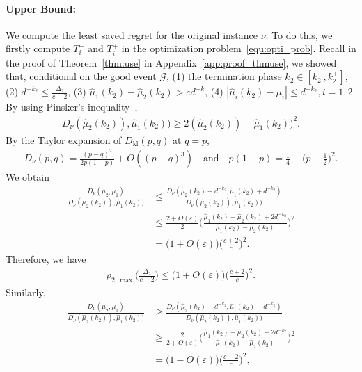\documentclass[twoside,11pt]{article}
\newcommand{\kl}{D_{\mathrm{kl}}}
\newcommand{\calG}{\mathcal{G}}
\newcommand{\hatmu}{\hat{\mu}}
\newcommand{\klnu}{D_{\nu}}
\begin{document}
\paragraph{Upper Bound:}  
We compute the least saved regret for the original instance $\nu$.
To do this, we firstly compute $T_i^-$ and $T_i^+$ in the optimization problem~\eqref{equ:opti_prob}.
Recall in the proof of Theorem~\ref{thm:use} in Appendix~\ref{app:proof_thmuse}, we showed that, conditional on the good event $\calG$, (1) the termination phase $k_2\in[k_2^-,k_2^+]$, (2) $d^{-k_2}\leq \frac{\Delta_2}{c-2}$, (3) $\hatmu_1(k_2)-\hatmu_2(k_2)>cd^{-k}$, (4) $|\hatmu_i(k_2)-\mu_i|\leq d^{-k_2},i=1,2$.
By using Pinsker's inequality~\citep{Friedrich2019High},
\begin{align}
    \klnu(\hatmu_2(k_2)),\hatmu_1(k_2)) \geq 2 (\hatmu_2(k_2))-\hatmu_1(k_2))^2.
\end{align}
By the Taylor expansion of $\kl(p,q)$ at $q=p$, 
\begin{align}\label{equ:taylor_kl}
    \klnu(p,q)=\frac{(p-q)^2}{2p(1-p)} + O((p-q)^3)
    \quad\mbox{and}\quad
    p(1-p) = \frac{1}{4}-\bigg(p-\frac{1}{2}\bigg)^2.
\end{align}
We obtain
\begin{align}
    \frac{\klnu(\mu_2,\mu_1)}{\klnu(\hatmu_2(k_2)),\hatmu_1(k_2))}
    &\leq 
    \frac{\klnu(\hatmu_2(k_2)-d^{-k_2},\hatmu_1(k_2)+d^{-k_2})}{\klnu(\hatmu_2(k_2)),\hatmu_1(k_2))}
    \\
    &\leq
    \frac{2+O(\varepsilon)}{2} \bigg(\frac{\hatmu_1(k_2)-\hatmu_2(k_2)+2d^{-k_2}}{\hatmu_1(k_2)-\hatmu_2(k_2)}\bigg)^2
    \\
    &= \big(1+O(\varepsilon) \big)\Big(\frac{c+2}{c}\Big)^2.
\end{align}
Therefore, we have
\begin{align}\label{equ:tight_rho_max}
     \rho_{2,\max}\Big(\frac{\Delta_2}{c-2}\Big)\leq \big(1+O(\varepsilon) \big)\Big(\frac{c+2}{c}\Big)^2.
\end{align}
Similarly,
\begin{align}
    \frac{\klnu(\mu_2,\mu_1)}{\klnu(\hatmu_2(k_2)),\hatmu_1(k_2))}
    &\geq 
    \frac{\klnu(\hatmu_2(k_2)+d^{-k_2},\hatmu_1(k_2)-d^{-k_2})}{\klnu(\hatmu_2(k_2)),\hatmu_1(k_2))}
    \\
    &\geq
    \frac{2}{2+O(\varepsilon)} \bigg(\frac{\hatmu_1(k_2)-\hatmu_2(k_2)-2d^{-k_2}}{\hatmu_1(k_2)-\hatmu_2(k_2)}\bigg)^2
    \\
    &= \big(1-O(\varepsilon) \big)\Big(\frac{c-2}{c}\Big)^2,
\end{align}
\end{document}
